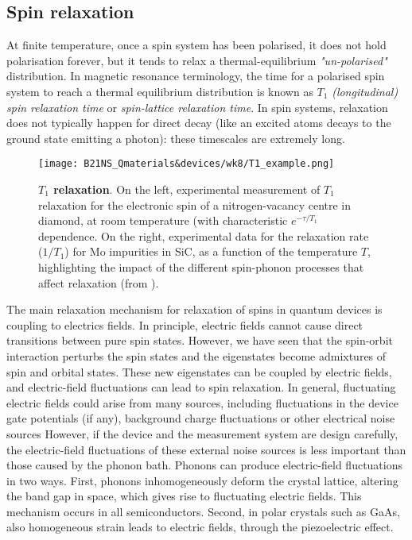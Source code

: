 \documentclass[a4paper,11pt]{article}
\begin{document}
\subsection {Spin relaxation}
At finite temperature, once a spin system has been polarised, it does not hold polarisation forever, but it tends to relax a thermal-equilibrium {\it "un-polarised"} distribution. In magnetic resonance terminology, the time for a polarised spin system to reach a thermal equilibrium distribution is known as $T_1$ {\it (longitudinal) spin relaxation time} or {\it spin-lattice relaxation time}. In spin systems, relaxation does not typically happen for direct decay (like an excited atoms decays to the ground state emitting a photon): these timescales are extremely long.

\begin{figure}[h]
\centering
\texttt{[image: B21NS\_Qmaterials\&devices/wk8/T1\_example.png]}
\caption{{\bf $T_1$ relaxation}. On the left, experimental measurement of $T_1$ relaxation for the electronic spin of a nitrogen-vacancy centre in diamond, at room temperature (with characteristic $e^{-\tau/T_1}$ dependence. On the right, experimental data for the relaxation rate ($1/T_1$) for Mo impurities in SiC, as a function of the temperature $T$, highlighting the impact of the different spin-phonon processes that affect relaxation (from \cite{gilardoni_spin-relaxation_2020}).}
\label{fig:T1_exp}
\end{figure}


The main relaxation mechanism for relaxation of spins in quantum devices is coupling to electrics fields. In principle, electric fields cannot cause direct transitions between pure spin states. However, we have seen that the spin-orbit
interaction perturbs the spin states and the eigenstates become admixtures of spin and orbital states. These new eigenstates can be coupled by electric fields, and electric-field fluctuations can lead to spin relaxation. In general, fluctuating electric fields could arise from
many sources, including fluctuations in the device gate potentials (if any), background charge fluctuations or other electrical
noise sources However, if the device and the measurement system are design carefully, the
electric-field fluctuations of these external noise sources is less important than those caused by the phonon bath. Phonons can produce electric-field fluctuations in two ways. First, phonons inhomogeneously deform the crystal lattice, altering the band gap in space, which gives rise to fluctuating electric fields. This mechanism occurs in all semiconductors. Second, in polar crystals such as GaAs, also homogeneous strain leads to electric fields, through the piezoelectric effect.
\end{document}
